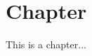 \chapter{Chapter}
\nopagebreak
\label{chap:chapter}
\thispagestyle{empty}

This is a chapter...


\clearpage
